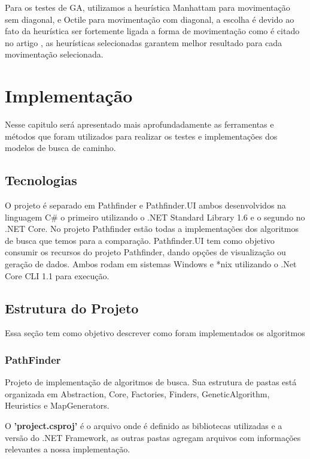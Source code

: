 Para os testes de GA, utilizamos a heurística Manhattam para movimentação sem diagonal, e Octile para movimentação com diagonal, a escolha é devido ao fato da heurística ser fortemente ligada a forma de movimentação como é citado no artigo \cite{GameProgrammingHeuristics}, as heurísticas selecionadas garantem melhor resultado para cada movimentação selecionada.

\chapter[Implementação]{Implementação}
 
Nesse capitulo será apresentado mais aprofundadamente as ferramentas e métodos que foram utilizados para realizar os testes  e implementações dos modelos de busca de caminho.
 
 \section{Tecnologias}
 O projeto é separado em Pathfinder e Pathfinder.UI ambos desenvolvidos na linguagem C\# o primeiro utilizando o .NET Standard Library 1.6 e o segundo no .NET Core. No projeto Pathfinder estão todas a  implementações dos algoritmos de busca que temos para a comparação. Pathfinder.UI tem como objetivo consumir os recursos do projeto Pathfinder, dando opções de visualização ou geração de dados. Ambos rodam em sistemas Windows e \**nix utilizando o .Net Core CLI 1.1 para execução.
 
 \section{Estrutura do Projeto}
 
 Essa seção tem como objetivo descrever como foram implementados os algoritmos 
 
 \subsection {PathFinder}
 
 Projeto de implementação de algoritmos de busca.
 Sua estrutura de pastas está organizada em Abstraction, Core, Factories, Finders, GeneticAlgorithm, Heuristics e MapGenerators.
 
 O \textbf{'project.csproj'} é o arquivo onde é definido as bibliotecas utilizadas e a versão do .NET Framework, as outras pastas agregam arquivos com informações relevantes a nossa implementação.
 
